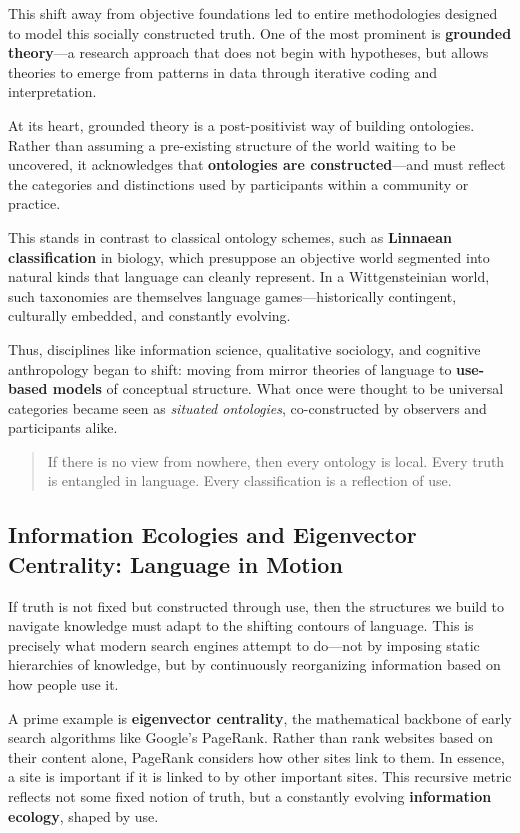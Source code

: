 This shift away from objective foundations led to entire methodologies designed to model this socially constructed truth. One of the most prominent is \textbf{grounded theory}—a research approach that does not begin with hypotheses, but allows theories to emerge from patterns in data through iterative coding and interpretation.

At its heart, grounded theory is a post-positivist way of building ontologies. Rather than assuming a pre-existing structure of the world waiting to be uncovered, it acknowledges that \textbf{ontologies are constructed}—and must reflect the categories and distinctions used by participants within a community or practice.

This stands in contrast to classical ontology schemes, such as \textbf{Linnaean classification} in biology, which presuppose an objective world segmented into natural kinds that language can cleanly represent. In a Wittgensteinian world, such taxonomies are themselves language games—historically contingent, culturally embedded, and constantly evolving.

Thus, disciplines like information science, qualitative sociology, and cognitive anthropology began to shift: moving from mirror theories of language to \textbf{use-based models} of conceptual structure. What once were thought to be universal categories became seen as \emph{situated ontologies}, co-constructed by observers and participants alike.

\begin{quote}
If there is no view from nowhere, then every ontology is local. Every truth is entangled in language. Every classification is a reflection of use.
\end{quote}

\subsection{Information Ecologies and Eigenvector Centrality: Language in Motion}

If truth is not fixed but constructed through use, then the structures we build to navigate knowledge must adapt to the shifting contours of language. This is precisely what modern search engines attempt to do—not by imposing static hierarchies of knowledge, but by continuously reorganizing information based on how people use it.

A prime example is \textbf{eigenvector centrality}, the mathematical backbone of early search algorithms like Google’s PageRank. Rather than rank websites based on their content alone, PageRank considers how other sites link to them. In essence, a site is important if it is linked to by other important sites. This recursive metric reflects not some fixed notion of truth, but a constantly evolving \textbf{information ecology}, shaped by use.

